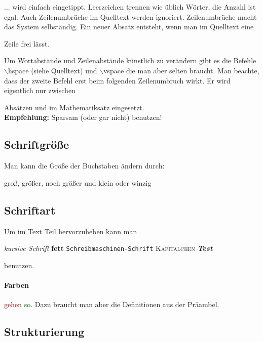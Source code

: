 \documentclass[12pt]{scrartcl}%
\theoremstyle{nonumberplain}
\begin{document}
... wird einfach eingetippt. Leerzeichen trennen wie üblich Wörter,
{\color{blue}die Anzahl ist        egal.}
Auch Zeilenumbrüche im Quelltext werden ignoriert.
Zeilenumbrüche macht das System
selbständig. Ein neuer Absatz entsteht, wenn man im Quelltext eine

Zeile frei lässt.  

Um Wortabstände und Zeilenabstände künstlich zu verändern gibt es die
Befehle
$\backslash$hspace \hspace{9mm} (siehe Quelltext) und 
$\backslash$vspace \vspace{10mm}
die man aber selten braucht. Man beachte, dass der zweite Befehl erst
beim folgenden Zeilenumbruch wirkt. Er wird eigentlich nur zwischen

\vspace{10mm}
Absätzen und im Mathematiksatz eingesetzt.\\  %
\textbf{Empfehlung:} Sparsam (oder gar nicht) benutzen!

\subsection{Schriftgröße}

Man kann die Größe der Buchstaben ändern durch:

{\large groß}, {\LARGE größer}, {\huge noch größer} und {\small klein}
oder {\tiny winzig} 

\subsection{Schriftart}

Um im Text Teil hervorzuheben kann man 

\textit{kursive Schrift}
\quad %
\textbf{fett}
\quad
\texttt{Schreibmaschinen-Schrift} 
\quad
\textsc{Kapitälchen}
\quad
\textbf{ \textit{Test}}

benutzen.

\paragraph{Farben}
\textcolor{darkred}{gehen} \textcolor{darkgreen}{so}.
Dazu braucht man aber die Definitionen aus der Präambel.

\subsection*{Strukturierung}
\end{document}
